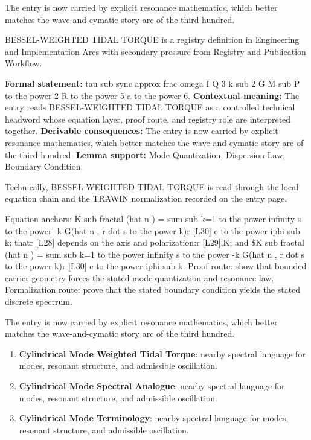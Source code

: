The entry is now carried by explicit resonance mathematics, which better matches the wave-and-cymatic story arc of the third hundred.
\clearpage


\begingroup\small
{}
BESSEL-WEIGHTED TIDAL TORQUE is a registry definition in Engineering and Implementation Arcs with secondary pressure from Registry and Publication Workflow.

\begingroup\footnotesize\setlength{\emergencystretch}{3em}\sloppy
\textbf{Formal statement:} tau sub sync approx frac omega I Q 3 k sub 2 G M sub P to the power 2 R to the power 5 a to the power 6. \textbf{Contextual meaning:} The entry reads BESSEL-WEIGHTED TIDAL TORQUE as a controlled technical headword whose equation layer, proof route, and registry role are interpreted together. \textbf{Derivable consequences:} The entry is now carried by explicit resonance mathematics, which better matches the wave-and-cymatic story arc of the third hundred. \textbf{Lemma support:} Mode Quantization; Dispersion Law; Boundary Condition.\par
\endgroup

Technically, BESSEL-WEIGHTED TIDAL TORQUE is read through the local equation chain and the TRAWIN normalization recorded on the entry page.

Equation anchors: K sub fractal (hat n ) = sum sub k=1 to the power infinity s to the power -k G(hat n , r dot s to the power k)r [L30] e to the power iphi sub k; thatr [L28] depends on the axis and polarization:r [L29],K; and \$K sub fractal (hat n ) = sum sub k=1 to the power infinity s to the power -k G(hat n , r dot s to the power k)r [L30] e to the power iphi sub k. Proof route: show that bounded carrier geometry forces the stated mode quantization and resonance law. Formalization route: prove that the stated boundary condition yields the stated discrete spectrum.

The entry is now carried by explicit resonance mathematics, which better matches the wave-and-cymatic story arc of the third hundred.
\endgroup

\begin{enumerate}[leftmargin=1.6em,itemsep=6pt,topsep=4pt]
\item \textbf{Cylindrical Mode Weighted Tidal Torque}: nearby spectral language for modes, resonant structure, and admissible oscillation.
\item \textbf{Cylindrical Mode Spectral Analogue}: nearby spectral language for modes, resonant structure, and admissible oscillation.
\item \textbf{Cylindrical Mode Terminology}: nearby spectral language for modes, resonant structure, and admissible oscillation.
\end{enumerate}

